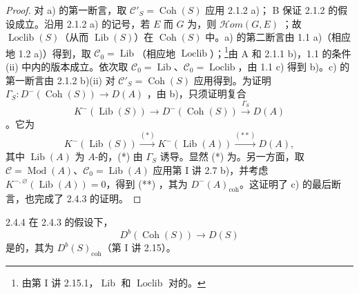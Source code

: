 \begin{proof}
对 a) 的第一断言，取 $\mathcal C'_S=\operatorname{Coh}(S)$ 应用 2.1.2 a)； B 保证 2.1.2 的假设成立。沿用 2.1.2 a) 的记号，若 $E$ 而 $G$ 为，则 $\mathcal Hom(G,E)$ ；故 $\operatorname{Loclib}(S)$（从而 $\operatorname{Lib}(S)$）在 $\operatorname{Coh}(S)$ 中。a) 的第二断言由 1.1 a)（相应地 1.2 a)）得到，取 $\mathcal C_0=\operatorname{Lib}$（相应地 $\operatorname{Loclib}$）；\footnote{由第 I 讲 2.15.1，$\operatorname{Lib}$ 和 $\operatorname{Loclib}$ 对的。}由 A 和 2.1.1 b)，1.1 的条件 (ii) 中内的版本成立。依次取 $\mathcal C_0=\operatorname{Lib}$、$\mathcal C_0=\operatorname{Loclib}$，由 1.1 c) 得到 b)。c) 的第一断言由 2.1.2 b)(ii) 对 $\mathcal C'_S=\operatorname{Coh}(S)$ 应用得到。为证明 $\Gamma_S:D^-(\operatorname{Coh}(S))\to D(A)$ ，由 b)，只须证明复合
\[
K^-(\operatorname{Lib}(S))\longrightarrow D^-(\operatorname{Coh}(S))\xrightarrow{\Gamma_S}D(A)
\]
。它为
\[
K^-(\operatorname{Lib}(S))\xrightarrow{(*)}K^-(\operatorname{Lib}(A))\xrightarrow{(**)}D(A),
\]
其中 $\operatorname{Lib}(A)$ 为 $A$-的，(*) 由 $\Gamma_S$ 诱导。显然 (*) 为。另一方面，取 $\mathcal C=\operatorname{Mod}(A)$、$\mathcal C_0=\operatorname{Lib}(A)$ 应用第 I 讲 2.7 b)，并考虑 $K^{-,\varnothing}(\operatorname{Lib}(A))=0$，得到 (**) ，其为 $D^-(A)_{\mathrm{coh}}$。这证明了 c) 的最后断言，也完成了 2.4.3 的证明。
\end{proof}
\begin{SGAresult}{}{2.4.4}
在 2.4.3 的假设下，
\[
D^b(\operatorname{Coh}(S))\longrightarrow D(S)
\]
是的，其为 $D^b(S)_{\mathrm{coh}}$（第 I 讲 2.15）。
\end{SGAresult}
